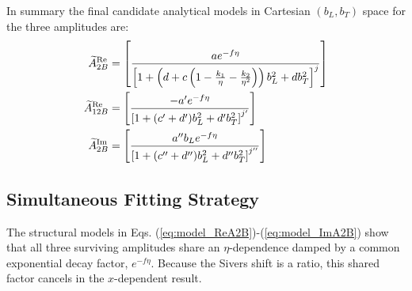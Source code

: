 In summary the final candidate analytical models in Cartesian $(b_L,b_T)$ space for the three amplitudes are:
\begin{align}
    \widetilde{A}_{2B}^{\text{Re}}&=\left[\frac{a e^{-f \eta}}{\left[1 + \left(d + c\left(1 - \frac{k_1}{\eta} - \frac{k_2}{\eta^2}\right)\right) b_L^2 + d b_T^2\right]^j}\right]\label{eq:model_ReA2B}\\
    \widetilde{A}_{12B}^{\text{Re}}&=\left[\frac{-a^{\prime} e^{-f \eta}}{\left[1 + (c^{\prime} + d^{\prime}) b_L^2 + d^{\prime} b_T^2\right]^{j^{\prime}}}\right]\label{eq:model_ReA12B}\\
    \widetilde{A}_{2B}^{\text{Im}}&=\left[\frac{a^{\prime\prime} b_L e^{-f \eta}}{\left[1 + (c^{\prime\prime} + d^{\prime\prime}) b_L^2 + d^{\prime\prime} b_T^2\right]^{j^{\prime\prime}}}\right]\label{eq:model_ImA2B}
\end{align}



\subsection{Simultaneous Fitting Strategy}
\label{sec:simultaneous_fit_strategy}

The structural models in Eqs. (\ref{eq:model_ReA2B})-(\ref{eq:model_ImA2B}) show that all three surviving amplitudes share an $\eta$-dependence damped by a common exponential decay factor, $e^{-f\eta}$. Because the Sivers shift is a ratio, this shared factor cancels in the $x$-dependent result. 

